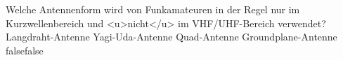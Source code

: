     {Welche Antennenform wird von Funkamateuren in der Regel nur im Kurzwellenbereich und <u>nicht</u> im VHF/UHF-Bereich verwendet?}
    {Langdraht-Antenne}
    {Yagi-Uda-Antenne}
    {Quad-Antenne}
    {Groundplane-Antenne}
    {false}{false}